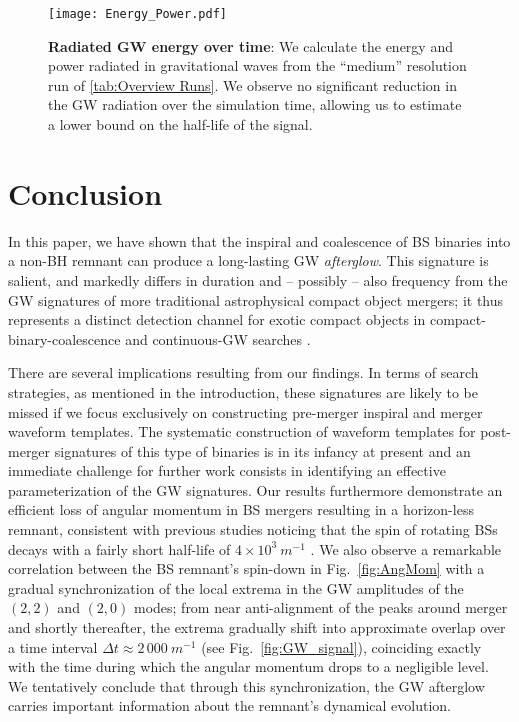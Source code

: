 \documentclass[11pt]{report}  %
\begin{document}
\begin{figure}[t]
\begin{center}
{\texttt{[image: Energy\_Power.pdf]}}
\caption{{\bf Radiated GW energy over time}: We calculate the energy and power radiated in gravitational waves from the ``medium'' resolution run of \cref{tab:Overview Runs}. 
We observe no significant reduction in the GW radiation over the simulation time, allowing us to estimate a lower bound on the half-life of the signal.
    }
\label{fig:EnergyPower}
\end{center}
\end{figure}

\section{Conclusion}\label{sec:conclusion}


In this paper, we have shown that the inspiral and
coalescence of BS binaries into a non-BH remnant can produce a long-lasting GW {\it afterglow}. This signature is salient, and markedly differs in duration and -- possibly -- also
frequency from the GW signatures of more traditional astrophysical compact object mergers; it thus represents a distinct detection channel for exotic compact objects
in compact-binary-coalescence and continuous-GW searches \cite{LIGOScientific:2019yhl,KAGRA:2021una,LIGOScientific:2021jlr,LIGOScientific:2021oez,LIGOScientific:2022lsr,LIGOScientific:2022pjk,LIGOScientific:2021hvc,LIGOScientific:2021ozr}.

There are several implications resulting from our
findings. In terms of search strategies, as mentioned in the introduction, these signatures are likely to be missed if we focus exclusively on constructing pre-merger inspiral and merger waveform templates. The systematic construction of waveform templates for post-merger signatures of this type of binaries
is in its infancy at present and an immediate challenge
for further work consists in identifying an effective
parameterization of the GW signatures. Our results furthermore
demonstrate an efficient loss of angular momentum in BS mergers
resulting in a horizon-less remnant, consistent with previous studies noticing that the spin of rotating BSs decays with a fairly short half-life of $4\times 10^3~m^{-1}$ \cite{Sanchis-Gual:2019ljs}. We also observe
a remarkable correlation between the BS remnant's spin-down
in Fig.~\ref{fig:AngMom} with a gradual synchronization
of the local extrema in the GW amplitudes of the $(2,2)$
and $(2,0)$ modes; from near anti-alignment of the
peaks around merger and shortly thereafter, the extrema
gradually shift into approximate overlap over a time
interval $\Delta t \approx 2\,000~m^{-1}$ (see
Fig.~\ref{fig:GW_signal}), coinciding
exactly with the time during which the angular momentum
drops to a negligible level.
We tentatively conclude that through this synchronization,
the GW afterglow carries important information about the remnant's dynamical evolution. 
\end{document}
